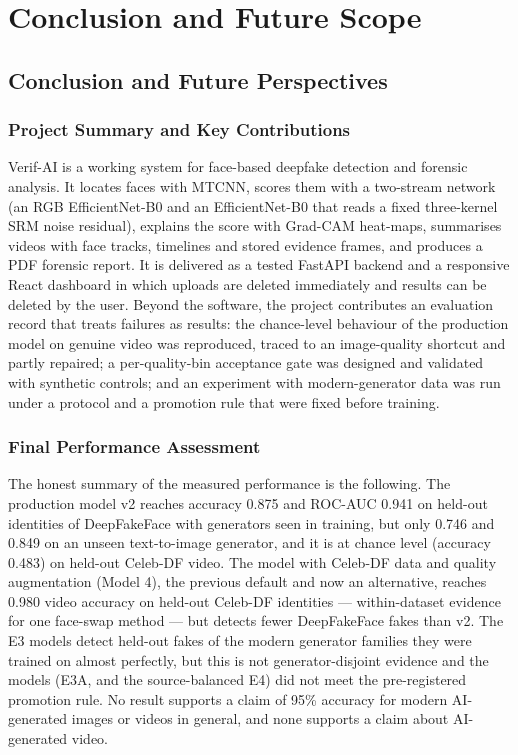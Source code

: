 \chapter{Conclusion and Future Scope}
\label{ch:concl}

\section{Conclusion and Future Perspectives}

\subsection{Project Summary and Key Contributions}
Verif-AI is a working system for face-based deepfake detection and forensic analysis. It locates faces with MTCNN, scores them with a two-stream
network (an RGB EfficientNet-B0 and an EfficientNet-B0 that reads a fixed three-kernel SRM noise residual), explains the score with Grad-CAM heat-maps,
summarises videos with face tracks, timelines and stored evidence frames, and produces a PDF forensic report. It is delivered as a tested FastAPI
backend and a responsive React dashboard in which uploads are deleted immediately and results can be deleted by the user. Beyond the software, the
project contributes an evaluation record that treats failures as results: the chance-level behaviour of the production model on genuine video was
reproduced, traced to an image-quality shortcut and partly repaired; a per-quality-bin acceptance gate was designed and validated with synthetic
controls; and an experiment with modern-generator data was run under a protocol and a promotion rule that were fixed before training.

\subsection{Final Performance Assessment}
The honest summary of the measured performance is the following. The production model v2 reaches accuracy 0.875 and ROC-AUC 0.941 on held-out identities
of DeepFakeFace with generators seen in training, but only 0.746 and 0.849 on an unseen text-to-image generator, and it is at chance level (accuracy
0.483) on held-out Celeb-DF video. The model with Celeb-DF data and quality augmentation (Model 4), the previous default and now an alternative, reaches 0.980 video accuracy on
held-out Celeb-DF identities --- within-dataset evidence for one face-swap method --- but detects fewer DeepFakeFace fakes than v2. The E3 models detect held-out
fakes of the modern generator families they were trained on almost perfectly, but this is not generator-disjoint evidence and the models (E3A, and the source-balanced E4) did not meet the
pre-registered promotion rule. No result supports a claim of 95\% accuracy for modern AI-generated images or videos in general, and none supports a
claim about AI-generated video.

